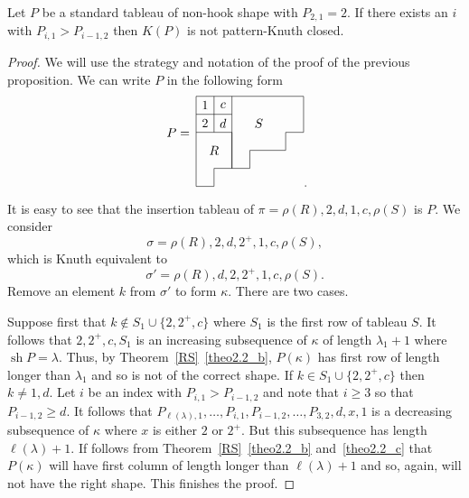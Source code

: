 \documentclass[ALCO,ThmDefs,Unicode,epreuves]{cedram}
\newcommand{\ka}{\kappa}
\newcommand{\la}{\lambda}
\newcommand{\si}{\sigma}
\DeclareMathOperator{\sh}{sh}
\begin{document}
\begin{prop}
Let $P$ be a standard tableau of non-hook shape with $P_{2,1}=2$. If there exists an $i$ with $P_{i,1}>P_{i-1,2}$ then $K(P)$ is not pattern-Knuth closed.
\end{prop}
\begin{proof}
We will use the strategy and notation of the proof of the previous proposition. We can write $P$ in the following form
\[
\begin{tikzpicture}[scale=.5]
\node at (-1,-2) {$P=$};
\draw (0,0) to (6,0) to (6,-2) to (5,-2) to (5,-3) to (3,-3) to (3,-4) to (2,-4) to (2,0);
\draw (0,-1) to (2,-1);
\draw (1,0) to (1,-2);
\draw (0,0) to (0,-5) to (1,-5) to (1,-4) to (2,-4) to (2,-2) to (0,-2);
\node at (.5,-.5) {$1$};
\node at (.5,-1.5) {$2$};
\node at (1.5,-.5) {$c$};
\node at (1.5,-1.5) {$d$};
\node at (1,-3) {$R$};
\node at (3.5,-1.5) {$S$};
\end{tikzpicture}.
\]
It is easy to see that the insertion tableau of $\pi= \rho(R), 2, d, 1, c, \rho(S)$ is $P$. We consider
\[
\si = \rho(R), 2, d, 2^+, 1, c, \rho(S),
\]
which is Knuth equivalent to
\[
\si' = \rho(R), d, 2, 2^+, 1, c, \rho(S).
\]
Remove an element $k$ from $\si'$ to form $\ka$. There are two cases.

Suppose first that $k\not\in S_1 \cup \{2,2^+,c\}$ where $S_1$ is the first row of tableau $S$. It follows that $2, 2^+, c, S_1$ is an increasing subsequence of $\ka$ of length $\la_1+1$ where $\sh P = \la$. Thus, by Theorem~\ref{RS}~\eqref{theo2.2_b}, $P(\ka)$ has first row of length longer than $\la_1$ and so is not of the correct shape. If $k\in S_1 \cup \{2,2^+,c\}$ then $k\neq 1,d$. Let $i$ be an index with $P_{i,1}>P_{i-1,2}$ and note that $i\ge3$ so that $P_{i-1,2}\ge d$. 
It follows that $P_{\ell(\la),1}, \dots, P_{i,1}, P_{i-1,2}, \dots, P_{3,2}, d, x, 1$ is a decreasing subsequence of $\ka$ where $x$ is either $2$ or $2^+$. But this subsequence has length $\ell(\la)+1$. If follows from Theorem~\ref{RS}~\eqref{theo2.2_b} and~\eqref{theo2.2_c} that $P(\ka)$ will have first column of length longer than $\ell(\la)+1$ and so, again, will not have the right shape. This finishes the proof.
\end{proof}
\end{document}
